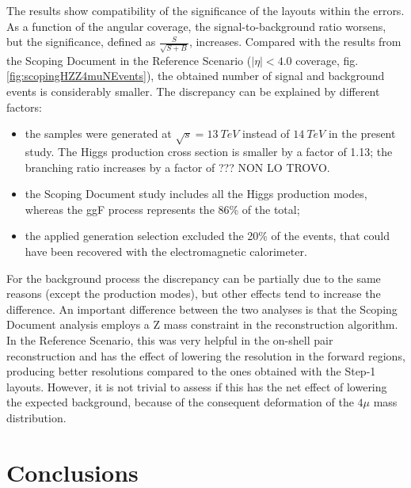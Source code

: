 \documentclass[a4paper,twoside,12pt]{article}
\begin{document}
The results show compatibility of the significance of the layouts within the errors. As a function of the angular coverage, the 
signal-to-background ratio worsens, but the significance, defined as $\frac{S}{\sqrt{S+B}}$, increases. 
Compared with the results from the Scoping Document in the Reference Scenario 
($|\eta| < 4.0$ coverage, fig.\ref{fig:scopingHZZ4muNEvents}), the obtained number of
signal and background events is considerably smaller. The discrepancy can be explained by 
different factors:\\
\begin{itemize}
\item the samples were generated at $\sqrt{s} = 13\ TeV$ instead of $14\ TeV$ in the present study. The Higgs
production cross section is smaller by a factor of 1.13; the branching ratio increases by a factor of ??? NON LO TROVO.
\item the Scoping Document study includes all the Higgs production modes, whereas the ggF process represents the 86\% of 
the total;
\item the applied generation selection excluded the 20\% of the events, that could have been recovered with
	the electromagnetic calorimeter.
\end{itemize} 

For the background process the discrepancy can be partially due to the same reasons (except the production modes), but other effects tend to increase the difference. 
An important difference between the two analyses is that the Scoping Document analysis employs a Z mass constraint
in the reconstruction algorithm. In the Reference Scenario, this was very helpful in the on-shell pair reconstruction and
has the effect of lowering the resolution in the forward regions, producing better resolutions compared to the
ones obtained with the Step-1 layouts. However, it is not trivial to assess if this has the net effect of lowering the expected
background, because of the consequent deformation of the $4\mu$ mass distribution. 

\clearpage
\section{Conclusions}\label{sec:conclusions}
\clearpage
\end{document}
